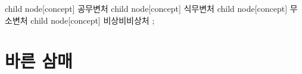 \documentclass[12pt, a3paper, landscape, oneside]{book}
\begin{document}
\begin{center}
{{%
							child		{ node[concept] {공무변처}}  
							child		{ node[concept] {식무변처}}    
							child		{ node[concept] {무소변처}}   
							child		{ node[concept] {비상비비상처}} 
								}
					};
		\end{center}

	\section{바른 삼매}
	\pagestyle{empty}
\end{document}
